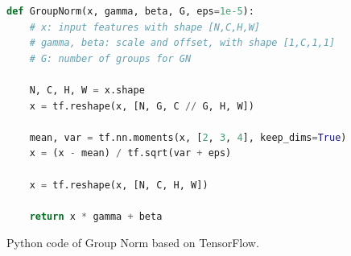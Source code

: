 \documentclass[10pt,twocolumn,letterpaper]{article}
\begin{document}
\begin{figure}[t]
\tiny
\begin{lstlisting}[language=python]
def GroupNorm(x, gamma, beta, G, eps=1e-5):
    # x: input features with shape [N,C,H,W]
    # gamma, beta: scale and offset, with shape [1,C,1,1]
    # G: number of groups for GN

    N, C, H, W = x.shape
    x = tf.reshape(x, [N, G, C // G, H, W])

    mean, var = tf.nn.moments(x, [2, 3, 4], keep_dims=True)
    x = (x - mean) / tf.sqrt(var + eps)

    x = tf.reshape(x, [N, C, H, W])

    return x * gamma + beta
\end{lstlisting}
\caption{Python code of Group Norm based on TensorFlow.}
\label{fig:code}
\vspace{-1em}
\end{figure}

%
\end{document}
